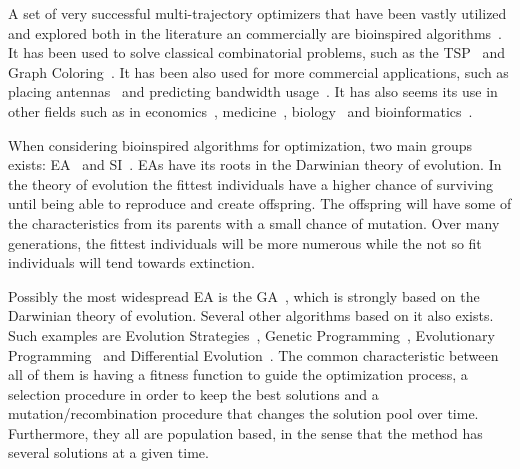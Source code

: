 A set of very successful multi-trajectory optimizers that have been vastly
utilized and explored both in the literature an commercially are bioinspired
algorithms~\cite{olariu2005handbook}. It has been used to solve classical
combinatorial problems, such as the
\ac{TSP}~\cite{chatterjee1996genetic} and Graph Coloring~\cite{costa1995embedding}.
It has been also used for more commercial applications, such as placing
antennas~\cite{calegari1997parallel} and predicting bandwidth
usage~\cite{swaminathan1999bandwidth}. It has also seems its use in other fields
such as in economics~\cite{li1996economic}, medicine~\cite{wehrens1993hips},
biology~\cite{cotta2002inferring} and bioinformatics~\cite{cotta2009metaheuristics}.

When considering bioinspired algorithms for optimization, two main groups
exists: \ac{EA}~\cite{back1996evolutionary} and
\ac{SI}~\cite{mavrovouniotis2017survey}. \ac{EA}s have its roots in the
Darwinian theory of evolution. In the theory of evolution the fittest
individuals have a higher chance of surviving until being able to reproduce and
create offspring. The offspring will have some of the characteristics from its
parents with a small chance of mutation. Over many
generations, the fittest individuals will be more numerous while the not so fit
individuals will tend towards extinction.

Possibly the most widespread \ac{EA} is the \ac{GA}~\cite{holland1992genetic},
which is strongly based on the Darwinian theory of evolution. Several other
algorithms based on it also exists. Such examples are
Evolution Strategies~\cite{michalewicz1996evolution},
Genetic Programming~\cite{koza1992genetic},
Evolutionary Programming~\cite{yao1996fast} and
Differential Evolution~\cite{storn1997differential}. The common characteristic
between all of them is having a fitness function to guide the optimization process,
a selection procedure in order to keep the best solutions and a mutation/recombination
procedure that changes the solution pool over time. Furthermore, they all are population
based, in the sense that the method has several solutions at a given time.


